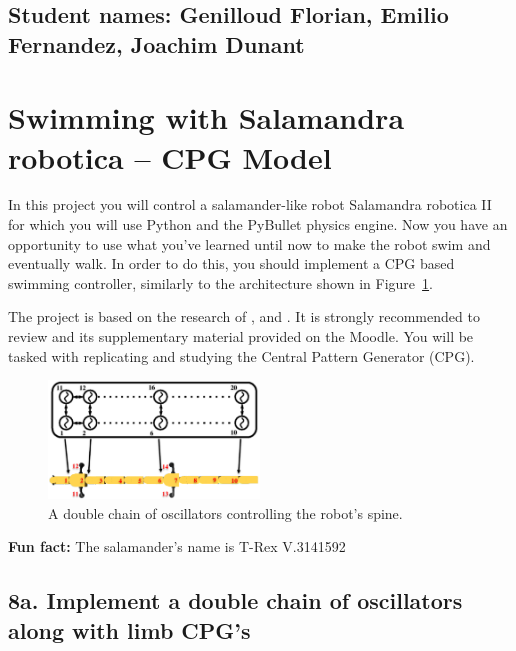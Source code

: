 \documentclass{cmc}
\begin{document}
\pagestyle{fancy}
 

\subsection*{Student names: Genilloud Florian, Emilio Fernandez, Joachim Dunant}

\section*{Swimming with Salamandra robotica – CPG Model}
\label{sec:exploring-swimming}

In this project you will control a salamander-like robot Salamandra
robotica II for which you will use Python and the PyBullet physics
engine. Now you have an opportunity to use what you’ve learned until
now to make the robot swim and eventually walk. In order to do this,
you should implement a CPG based swimming controller, similarly to the
architecture shown in Figure~\ref{fig:controller-model}.

The project is based on the research of \cite{Crespi2013},
\cite{Karakasiliotis2013} and \cite{ijspeert2007swimming}. It is strongly
recommended to review \cite{ijspeert2007swimming} and its supplementary material
provided on the Moodle. You will be tasked with replicating and
studying the Central Pattern Generator (CPG).

\begin{figure}[h]
  \centering
  \includegraphics[width=0.5\textwidth]{figures/model_controller.png}
  \caption[Controller model]{A double chain of oscillators controlling
    the robot’s spine.}
  \label{fig:controller-model}
\end{figure}

\textbf{Fun fact:} The salamander's name is T-Rex V.3141592

\subsection*{8a. Implement a double chain of oscillators along with
  limb CPG's}
\label{sec:implement-chain}
\end{document}

